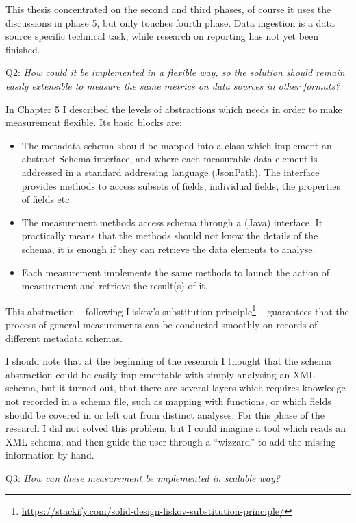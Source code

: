 This thesis concentrated on the second and third phases, of course it uses the discussions in phase 5, but only touches fourth phase. Data ingestion is a data source specific technical task, while research on reporting has not yet been finished.

Q2: \emph{How could it be implemented in a flexible way, so the solution should remain easily extensible to measure the same metrics on data sources in other formats?}

In Chapter 5 I described the levels of abstractions which needs in order to make measurement flexible. Its basic blocks are:

\begin{itemize}
  \item The metadata schema should be mapped into a class which implement an abstract Schema interface, and where each measurable data element is addressed in a standard addressing language (JsonPath). The interface provides methods to access subsets of fields, individual fields, the properties of fields etc.
  \item The measurement methods access schema through a (Java) interface. It practically means that the methods should not know the details of the schema, it is enough if they can retrieve the data elements to analyse.
  \item Each measurement implements the same methods to launch the action of measurement and retrieve the result(s) of it.
\end{itemize}

This abstraction -- following Liskov's substitution principle\footnote{\url{https://stackify.com/solid-design-liskov-substitution-principle/}} -- guarantees that the process of general measurements can be conducted smoothly on records of different metadata schemas.

I should note that at the beginning of the research I thought that the schema abstraction could be easily implementable with simply analysing an XML schema, but it turned out, that there are several layers which requires knowledge not recorded in a schema file, such as mapping with functions, or which fields should be covered in or left out from distinct analyses. For this phase of the research I did not solved this problem, but I could imagine a tool which reads an XML schema, and then guide the user through a ``wizzard'' to add the missing information by hand.


Q3: \emph{How can these measurement be implemented in scalable way?}

